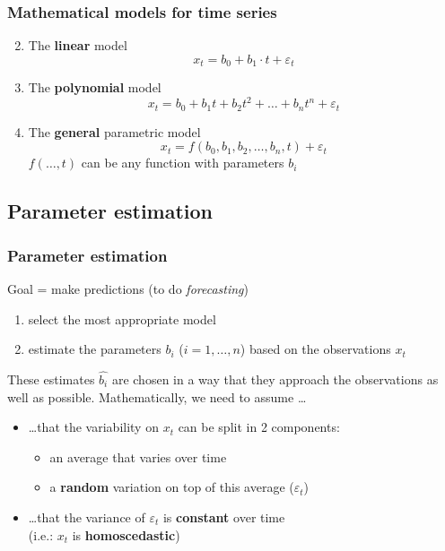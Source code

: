 \documentclass{beamer}
\begin{document}
\begin{frame}
  \frametitle{Mathematical models for time series}

  \begin{enumerate}
  \setcounter{enumi}{1}
  \item The \textbf{linear} model
  \begin{equation}
    x_{t} = b_{0} + b_{1} \cdot t + \varepsilon_{t}
    \label{eq:timeseries-linear}
  \end{equation}
\vfill
  \item The \textbf{polynomial} model
  \begin{equation}
    x_{t} = b_{0} + b_{1} t + b_{2} t^{2} + \dots + b_{n} t^{n} + \varepsilon_{t}
    \label{eq:timeseries-polynomial}
  \end{equation}
\vfill
\item The \textbf{general} parametric model
  \begin{equation}
    x_{t} = f(b_{0}, b_{1}, b_{2}, \ldots , b_{n}, t) + \varepsilon_{t}
    \label{eq:timeseries-parametric}
  \end{equation}
$f(\ldots,t)$ can be any function with parameters $b_i$
  \end{enumerate}
\end{frame}

\subsection{Parameter estimation}

\begin{frame}
  \frametitle{Parameter estimation}

  Goal = make predictions (to do \textit{forecasting})

  \begin{enumerate}
    \item select the most appropriate model
    \item estimate the parameters $b_i$ ($i=1, \dots, n$) based on the observations $x_t$
  \end{enumerate}

  These estimates $\widehat{b_i}$ are chosen in a way that they approach the observations as well as possible.
\vfill
  Mathematically, we need to assume \ldots
\begin{itemize}
    \item \ldots that the variability on $x_t$ can be split in 2 components:
    \begin{itemize}
        \item an average that varies over time
        \item a \textbf{random} variation on top of this average ($\varepsilon_t$)
    \end{itemize}
    \item \ldots that the variance of $\varepsilon_{t}$ is \textbf{constant} over time\\
    (i.e.: $x_t$ is \textbf{homoscedastic})
\end{itemize}

\end{frame}
\end{document}
